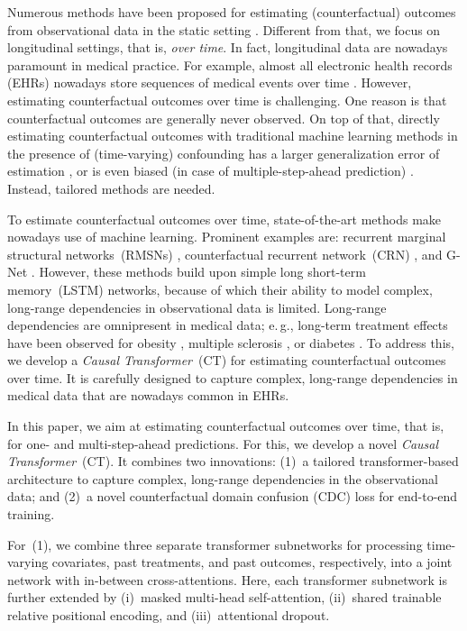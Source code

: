 \documentclass{article}
\newcommand\eg{e.\,g.\xspace}
\theoremstyle{plain}
\theoremstyle{definition}
\theoremstyle{remark}
\newcommand{\longname}{\emph{Causal Transformer}\xspace}
\newcommand{\shortname}{CT\xspace}
\begin{document}
Numerous methods have been proposed for estimating (counterfactual) outcomes from observational data in the static setting \cite{van2006targeted,chipman2010bart,johansson2016learning,curth2021nonparametric,kuzmanovic2022estimating}. Different from that, we focus on longitudinal settings, that is, \emph{over time}. In fact, longitudinal data are nowadays paramount in medical practice. For example, almost all electronic health records (EHRs) nowadays store sequences of medical events over time \cite{allam2021analyzing}. However, estimating counterfactual outcomes over time is challenging. One reason is that counterfactual outcomes are generally never observed. On top of that, directly estimating counterfactual outcomes with traditional machine learning methods in the presence of (time-varying) confounding has a larger generalization error of estimation \cite{alaa2018limits}, or is even biased (in case of multiple-step-ahead prediction) \cite{robins2009estimation,frauen2022estimating}. Instead, tailored methods are needed. 


To estimate counterfactual outcomes over time, state-of-the-art methods make nowadays use of machine learning. Prominent examples are: recurrent marginal structural networks~(RMSNs) \cite{lim2018forecasting}, counterfactual recurrent network~(CRN) \cite{bica2020estimating}, and G-Net \cite{li2021g}. However, these methods build upon simple long short-term memory~(LSTM) networks, because of which their ability to model complex, long-range dependencies in observational data is limited. Long-range dependencies are omnipresent in medical data; \eg, long-term treatment effects have been observed for obesity \cite{latner2000effective}, multiple sclerosis \cite{sormani2015can}, or diabetes \cite{jacobson2013long}. To address this, we develop a \longname~(\shortname) for estimating counterfactual outcomes over time. It is carefully designed to capture complex, long-range dependencies in medical data that are nowadays common in EHRs. 

In this paper, we aim at estimating counterfactual outcomes over time, that is, for one- and multi-step-ahead predictions. For this, we develop a novel \longname~(\shortname). It combines two innovations: (1)~a tailored transformer-based architecture to capture complex, long-range dependencies in the observational data; and (2)~a novel counterfactual domain confusion (CDC) loss for end-to-end training. 

For~(1), we combine three separate transformer subnetworks for processing time-varying covariates, past treatments, and past outcomes, respectively, into a joint network with in-between cross-attentions. Here, each transformer subnetwork is further extended by (i)~masked multi-head self-attention, (ii)~shared trainable relative positional encoding, and (iii)~attentional dropout. 
\end{document}

